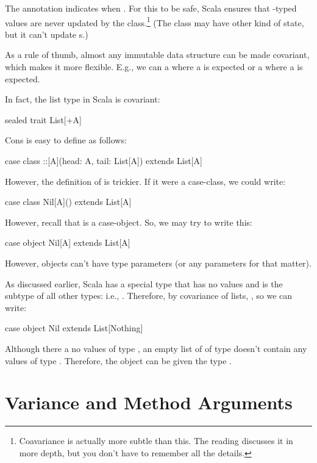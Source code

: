 \documentclass[9pt]{extbook}
\begin{document}
The  annotation indicates  when . For this to be safe,
Scala ensures that -typed values are never updated
by the class.\footnote{Coavariance is actually more subtle than this. The reading discusses it in more depth, but you don't have to remember all the details.} (The class may have other kind of state, but it can't
update s.)

As a rule of thumb, almost any immutable data structure can be made
covariant, which makes it more flexible. E.g., we can a 
where a  is expected or a 
where a  is expected.

In fact, the list type in Scala is covariant:
%
\begin{scalacode}
sealed trait List[+A]
\end{scalacode}
Cons is easy to define as follows:
\begin{scalacode}
case class ::[A](head: A, tail: List[A]) extends List[A]
\end{scalacode}
However, the definition of  is trickier. If it were a case-class,
we could write:
\begin{scalacode}
case class Nil[A]() extends List[A]
\end{scalacode}
However, recall that  is a case-object. So, we may try to
write this:
\begin{scalacode}
case object Nil[A] extends List[A]
\end{scalacode}
However, objects can't have type parameters (or any parameters for that matter).

As discussed earlier, Scala has a special type  that has no values
and is the subtype of all other types: i.e.,
. Therefore, by covariance of lists, , so
we can write:
\begin{scalacode}
case object Nil extends List[Nothing]
\end{scalacode}
Although there a no values of type , an empty list of
of type  doesn't contain any values of type .
Therefore, the  object can be given the type .

\chapter{Variance and Method Arguments}
\end{document}
